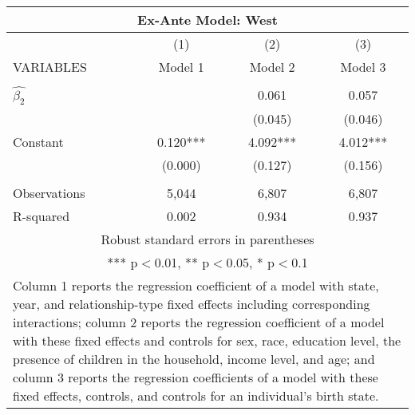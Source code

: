 \begin{tabular}{lccc}
\multicolumn{4}{c}{Ex-Ante Model: West} \\ \hline
 & (1) & (2) & (3) \\
VARIABLES & Model 1 & Model 2 & Model 3 \\ \hline
 &  &  &  \\
$\hat{\beta_2}$ &  & 0.061 & 0.057 \\
 &  & (0.045) & (0.046) \\
Constant & 0.120*** & 4.092*** & 4.012*** \\
 & (0.000) & (0.127) & (0.156) \\
 &  &  &  \\
Observations & 5,044 & 6,807 & 6,807 \\
 R-squared & 0.002 & 0.934 & 0.937 \\ \hline
\multicolumn{4}{c}{ Robust standard errors in parentheses} \\
\multicolumn{4}{c}{ *** p$<$0.01, ** p$<$0.05, * p$<$0.1} \\
\multicolumn{4}{p{0.8\linewidth}}{\small Column 1 reports the regression coefficient of a model with state, year, and relationship-type fixed effects including corresponding interactions; column 2 reports the regression coefficient of a model with these fixed effects and controls for sex, race, education level, the presence of children in the household, income level, and age; and column 3 reports the regression coefficients of a model with these fixed effects, controls, and controls for an individual’s birth state.} \\
\end{tabular}
